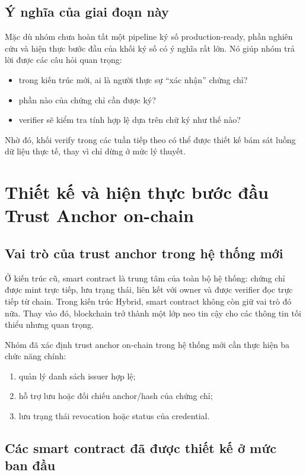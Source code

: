 \subsection{Ý nghĩa của giai đoạn này}

Mặc dù nhóm chưa hoàn tất một pipeline ký số production-ready, phần nghiên cứu và hiện thực bước đầu của khối ký số có ý nghĩa rất lớn. Nó giúp nhóm trả lời được các câu hỏi quan trọng:
\begin{itemize}
    \item trong kiến trúc mới, ai là người thực sự ``xác nhận'' chứng chỉ?
    \item phần nào của chứng chỉ cần được ký?
    \item verifier sẽ kiểm tra tính hợp lệ dựa trên chữ ký như thế nào?
\end{itemize}

Nhờ đó, khối verify trong các tuần tiếp theo có thể được thiết kế bám sát luồng dữ liệu thực tế, thay vì chỉ dừng ở mức lý thuyết.

\section{Thiết kế và hiện thực bước đầu Trust Anchor on-chain}

\subsection{Vai trò của trust anchor trong hệ thống mới}

Ở kiến trúc cũ, smart contract là trung tâm của toàn bộ hệ thống: chứng chỉ được mint trực tiếp, lưu trạng thái, liên kết với owner và được verifier đọc trực tiếp từ chain. Trong kiến trúc Hybrid, smart contract không còn giữ vai trò đó nữa. Thay vào đó, blockchain trở thành một lớp neo tin cậy cho các thông tin tối thiểu nhưng quan trọng.

Nhóm đã xác định trust anchor on-chain trong hệ thống mới cần thực hiện ba chức năng chính:
\begin{enumerate}
    \item quản lý danh sách issuer hợp lệ;
    \item hỗ trợ lưu hoặc đối chiếu anchor/hash của chứng chỉ;
    \item lưu trạng thái revocation hoặc status của credential.
\end{enumerate}

\subsection{Các smart contract đã được thiết kế ở mức ban đầu}

